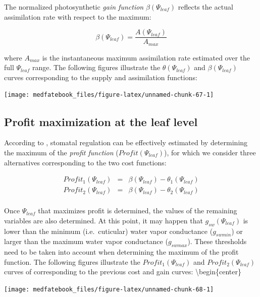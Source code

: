 \documentclass[]{book}
\begin{document}
The normalized photosynthetic \emph{gain function}
\(\beta(\Psi_{leaf})\) reflects the actual assimilation rate with
respect to the maximum:

\begin{equation}
\beta(\Psi_{leaf}) = \frac{A(\Psi_{leaf})}{A_{max}}
\end{equation}

where \(A_{max}\) is the instantaneous maximum assimilation rate
estimated over the full \(\Psi_{leaf}\) range. The following figures
illustrate the \(\theta(\Psi_{leaf})\) and \(\beta(\Psi_{leaf})\) curves
corresponding to the supply and assimilation functions:

\begin{center}\texttt{[image: medfatebook\_files/figure-latex/unnamed-chunk-67-1]} \end{center}

\subsection{Profit maximization at the leaf
level}\label{profit-maximization-at-the-leaf-level}

According to \citet{Sperry2016}, stomatal regulation can be effectively
estimated by determining the maximum of the \emph{profit function}
(\(Profit(\Psi_{leaf})\)), for which we consider three alternatives
corresponding to the two cost functions:

\begin{eqnarray}
Profit_1(\Psi_{leaf}) &=& \beta(\Psi_{leaf})-\theta_1(\Psi_{leaf})\\
Profit_2(\Psi_{leaf}) &=& \beta(\Psi_{leaf})-\theta_2(\Psi_{leaf})\\
\end{eqnarray}

Once \(\Psi_{leaf}\) that maximizes profit is determined, the values of
the remaining variables are also determined. At this point, it may
happen that \(g_{sw}(\Psi_{leaf})\) is lower than the minimum
(i.e.~cuticular) water vapor conductance (\(g_{swmin}\)) or larger than
the maximum water vapor conductance (\(g_{swmax}\)). These thresholds
need to be taken into account when determining the maximum of the profit
function. The following figures illustrate the \(Profit_1(\Psi_{leaf})\)
and \(Profit_2(\Psi_{leaf})\) curves of corresponding to the previous
cost and gain curves: \textbackslash{}begin\{center\}

\begin{center}\texttt{[image: medfatebook\_files/figure-latex/unnamed-chunk-68-1]} \end{center}
\end{document}
